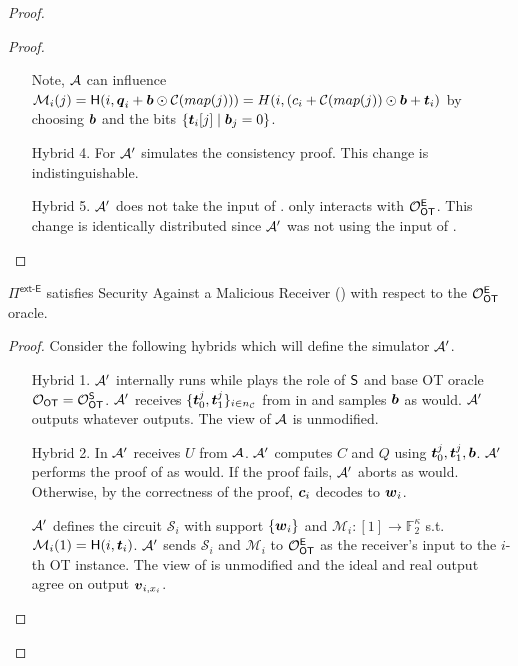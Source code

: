 \begin{proof}
\begin{proof}
\begin{enumerate}[leftmargin=1.8cm]
			Note, $\mathcal{A}$ can influence $\mathcal{M}_i(j)=\mathsf{H}(i, \boldsymbol{q}_i+\boldsymbol{b}\odot \mathcal{C}(map(j)))=H(i, (c_i + \mathcal{C}(map(j)) \odot \boldsymbol{b} + \boldsymbol{t}_i)$ by choosing $\boldsymbol{b}$ and the bits $\{\boldsymbol{t}_i[j] \mid \boldsymbol{b}_j=0\}$.
			
			\item[Hybrid 4.] For  $\mathcal{A}'$ simulates the consistency proof. This change is indistinguishable. 
			
			\item[Hybrid 5.] $\mathcal{A}'$ does not take the input of \rec. \rec only interacts with $\mathcal{O}_{\mathsf{OT}}^\mathsf{E}$. This change is identically distributed since $\mathcal{A}'$ was not using the input of \rec.
		\end{enumerate}
	\end{proof}

	\begin{claim}\label{claim:ext-E-MalReceiver}
	$\Pi^\textsf{ext-E}$ satisfies Security Against a Malicious Receiver () with respect to the $\mathcal{O}_{\mathsf{OT}}^\mathsf{E}$ oracle.
	\end{claim}
	\begin{proof}
				Consider the following hybrids which will define the simulator $\mathcal{A}'$. 
		\begin{enumerate}[leftmargin=1.8cm]
			\item[Hybrid 1.] $\mathcal{A}'$ internally runs \Adv while plays the role of $\mathsf{S}$ and base OT oracle $\mathcal{O}_{\mathsf{OT}}=\mathcal{O}_{\mathsf{OT}}^\mathsf{S}$. $\mathcal{A}'$ receives $\{\boldsymbol{t}^j_0,\boldsymbol{t}^j_1\}_{i\in{n_\mathcal{C}}}$ from \Adv in  and samples $\boldsymbol{b}$ as \send would. $\mathcal{A}'$ outputs whatever \Adv outputs. The view of $\mathcal{A}$ is unmodified.
			
			\item[Hybrid 2.] In  $\mathcal{A}'$ receives $U$ from $\mathcal{A}$.  $\mathcal{A}'$ computes $C$ and $Q$ using $\boldsymbol{t}_0^j,\boldsymbol{t}_1^j,\boldsymbol{b}$. $\mathcal{A}'$ performs the proof of  as \send would. If the proof fails, $\mathcal{A}'$ aborts as \send would. Otherwise, by the correctness of the proof, $\boldsymbol{c}_i$ decodes to $\boldsymbol{w}_i$.
			
			$\mathcal{A}'$ defines the circuit $\mathcal{S}_i$ with support $\{\boldsymbol{w}_i\}$ and $\mathcal{M}_i:[1]\rightarrow\mathbb{F}^\kappa_2$ s.t. $\mathcal{M}_i(1)=\mathsf{H}(i, \boldsymbol{t}_i)$. $\mathcal{A}'$ sends $\mathcal{S}_i$ and $\mathcal{M}_i$ to $\mathcal{O}_{\mathsf{OT}}^\mathsf{E}$ as the receiver's input to the $i$-th OT instance. The view of \Adv is unmodified and the ideal and real output agree on output $\boldsymbol{v}_{i,x_i}$.
			

\end{enumerate}
\end{proof}
\end{proof}
